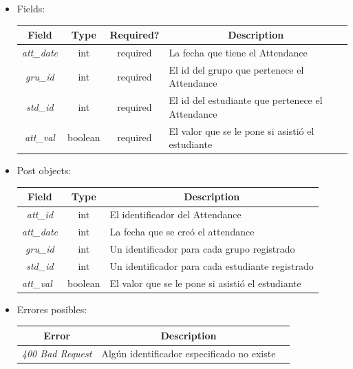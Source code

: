 \documentclass{article}
\begin{document}
\begin{enumerate}[i.]
\begin{itemize}
        \item Fields:
        \begin{table}[H] \centering \begin{tabular}{|c|c|c|l|} \hline \textbf{Field}
        & \textbf{Type} & \textbf{Required?} &
        \multicolumn{1}{c|}{\textbf{Description}} \\ \hline \textit{att\_date} &
        int & required & La fecha que tiene el Attendance \\ \hline
        \textit{gru\_id} & int & required & El id del grupo que pertenece el
        Attendance \\ \hline \textit{std\_id} & int & required & El id del
        estudiante que pertenece el Attendance \\ \hline \textit{att\_val} &
        boolean & required & El valor que se le pone si asistió el estudiante \\
        \hline \end{tabular} \end{table}
        \item Post objects:
        \begin{table}[H] \centering \begin{tabular}{|c|c|l|} \hline \textbf{Field} &
        \textbf{Type} & \multicolumn{1}{c|}{\textbf{Description}} \\ \hline
        \textit{att\_id} & int & El identificador del Attendance \\ \hline
        \textit{att\_date} & int & La fecha que se creó el attendance \\ \hline
        \textit{gru\_id} & int & Un identificador para cada grupo registrado \\
        \hline \textit{std\_id} & int & Un identificador para cada estudiante
        registrado \\ \hline \multicolumn{1}{|l|}{\textit{att\_val}} &
        \multicolumn{1}{l|}{boolean} & El valor que se le pone si asistió el
        estudiante \\ \hline \end{tabular} \end{table}
        \item Errores posibles:
        \begin{table}[H] \centering \begin{tabular}{|c|c|l|} \hline \textbf{Error} &
        \textbf{Description} \\ \hline \textit{400 Bad Request} & Algún
        identificador especificado no existe \\ \hline
        \end{tabular}
        \end{table}
    \end{itemize}


\end{enumerate}
\end{document}
